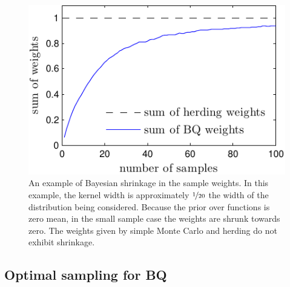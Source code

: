 \documentclass[]{article}
\begin{document}
\begin{figure}
\centering
\includegraphics[width=\columnwidth]{figures/weights_shrinkage}
\caption{An example of Bayesian shrinkage in the sample weights.  In this example, the kernel width is approximately $\nicefrac{1}{20}$ the width of the distribution being considered.  Because the prior over functions is zero mean, in the small sample case the weights are shrunk towards zero.  The weights given by simple Monte Carlo and herding do not exhibit shrinkage. }
\label{fig:weights_shrinkage}
\end{figure}



\subsection{Optimal sampling for BQ}
\end{document}
